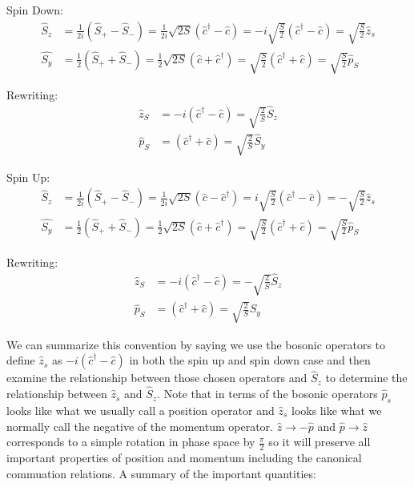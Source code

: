\documentclass[12pt]{article}
\begin{document}
Spin Down:
\begin{align}
\hat{S}_z &= \frac{1}{2i}\left(\hat{S}_+-\hat{S}_-\right) = \frac{1}{2i}\sqrt{2S}(\hat{c}^{\dag}-\hat{c}) = -i\sqrt{\frac{S}{2}}(\hat{c}^{\dag}-\hat{c}) = \sqrt{\frac{S}{2}}\hat{z}_s\\
\hat{S_y} &= \frac{1}{2} \left( \hat{S}_+ + \hat{S}_- \right) = \frac{1}{2} \sqrt{2S} \left( \hat{c} + \hat{c}^{\dag} \right) =  \sqrt{\frac{S}{2}} \left(\hat{c}^{\dag} + \hat{c}\right) = \sqrt{\frac{S}{2}} \hat{p}_S
\end{align}

Rewriting:
\begin{align}
\hat{z}_S &= -i(\hat{c}^{\dag} - \hat{c}) = \sqrt{\frac{2}{S}} \hat{S}_z \\
\hat{p}_S &= (\hat{c}^{\dag} + \hat{c}) = \sqrt{\frac{2}{S}} \hat{S}_y 
\end{align}

Spin Up:
\begin{align}
\hat{S}_z &= \frac{1}{2i}\left(\hat{S}_+-\hat{S}_-\right) = \frac{1}{2i}\sqrt{2S}(\hat{c}-\hat{c}^{\dag}) = i\sqrt{\frac{S}{2}}(\hat{c}^{\dag}-\hat{c}) = -\sqrt{\frac{S}{2}}\hat{z}_s\\
\hat{S_y} &= \frac{1}{2} \left( \hat{S}_+ + \hat{S}_- \right) = \frac{1}{2} \sqrt{2S} \left( \hat{c} + \hat{c}^{\dag} \right) =  \sqrt{\frac{S}{2}} \left(\hat{c}^{\dag} + \hat{c}\right) = \sqrt{\frac{S}{2}} \hat{p}_S
\end{align}

Rewriting:
\begin{align}
\hat{z}_S &= -i(\hat{c}^{\dag} - \hat{c}) = -\sqrt{\frac{2}{S}} \hat{S}_z \\
\hat{p}_S &= (\hat{c}^{\dag} + \hat{c}) = \sqrt{\frac{2}{S}} \hat{S}_y 
\end{align}

We can summarize this convention by saying we use the bosonic operators to define $\hat{z}_s$ as $-i(\hat{c}^{\dag}-\hat{c})$ in both the spin up and spin down case and then examine the relationship between those chosen operators and $\hat{S}_z$ to determine the relationship between $\hat{z}_s$ and $\hat{S}_z$. Note that in terms of the bosonic operators $\hat{p}_s$ looks like what we usually call a position operator and $\hat{z}_s$ looks like what we normally call the negative of the momentum operator. $\hat{z}\rightarrow -\hat{p}$ and $\hat{p}\rightarrow \hat{z}$ corresponds to a simple rotation in phase space by $\frac{\pi}{2}$ so it will preserve all important properties of position and momentum including the canonical commuation relations. A summary of the important quantities:
\end{document}
